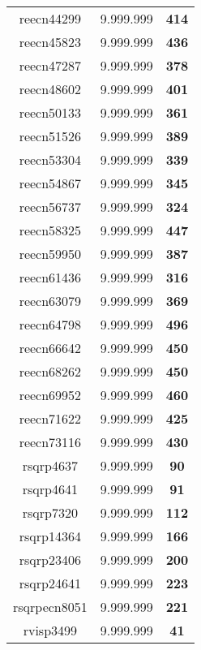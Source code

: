 \begin{tabular}{cc||c}
reecn44299       & 9.999.999        & {\bf 414}       \\ 
reecn45823       & 9.999.999        & {\bf 436}       \\ 
reecn47287       & 9.999.999        & {\bf 378}       \\ 
reecn48602       & 9.999.999        & {\bf 401}       \\ 
reecn50133       & 9.999.999        & {\bf 361}       \\ 
reecn51526       & 9.999.999        & {\bf 389}       \\ 
reecn53304       & 9.999.999        & {\bf 339}       \\ 
reecn54867       & 9.999.999        & {\bf 345}       \\ 
reecn56737       & 9.999.999        & {\bf 324}       \\ 
reecn58325       & 9.999.999        & {\bf 447}       \\ 
reecn59950       & 9.999.999        & {\bf 387}       \\ 
reecn61436       & 9.999.999        & {\bf 316}       \\ 
reecn63079       & 9.999.999        & {\bf 369}       \\ 
reecn64798       & 9.999.999        & {\bf 496}       \\ 
reecn66642       & 9.999.999        & {\bf 450}       \\ 
reecn68262       & 9.999.999        & {\bf 450}       \\ 
reecn69952       & 9.999.999        & {\bf 460}       \\ 
reecn71622       & 9.999.999        & {\bf 425}       \\ 
reecn73116       & 9.999.999        & {\bf 430}       \\ 
rsqrp4637        & 9.999.999        & {\bf 90}        \\ 
rsqrp4641        & 9.999.999        & {\bf 91}        \\ 
rsqrp7320        & 9.999.999        & {\bf 112}       \\ 
rsqrp14364       & 9.999.999        & {\bf 166}       \\ 
rsqrp23406       & 9.999.999        & {\bf 200}       \\ 
rsqrp24641       & 9.999.999        & {\bf 223}       \\ 
rsqrpecn8051     & 9.999.999        & {\bf 221}       \\ 
rvisp3499        & 9.999.999        & {\bf 41}        \\ 

\end{tabular}
